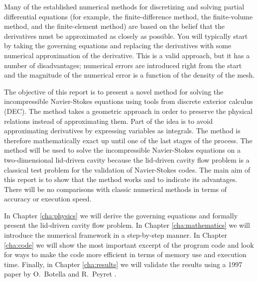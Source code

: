 Many of the established numerical methods for discretizing and solving partial differential equations (for example, the finite-difference method, the finite-volume method, and the finite-element method) are based on the belief that the derivatives must be approximated as closely as possible. You will typically start by taking the governing equations and replacing the derivatives with some numerical approximation of the derivative. This is a valid approach, but it has a number of disadvantages; numerical errors are introduced right from the start and the magnitude of the numerical error is a  function of the density of the mesh.  

The objective of this report is to present a novel method for solving the incompressible Navier-Stokes equations using tools from discrete exterior calculus (DEC). The method takes a geometric approach in order to preserve the physical relations instead of approximating them. Part of the idea is to avoid approximating derivatives by expressing variables as integrals. The method is therefore mathematically exact up until one of the last stages of the process. The method will be used to solve the incompressible Navier-Stokes equations on a two-dimensional lid-driven cavity because the lid-driven cavity flow problem is a classical test problem for the validation of Navier-Stokes codes. The main aim of this report is to show that the method works and to indicate its advantages. There will be no comparisons with classic numerical methods in terms of accuracy or execution speed.

In Chapter \ref{cha:physics} we will derive the governing equations and formally present the lid-driven cavity flow problem. In Chapter \ref{cha:mathematics} we will introduce the numerical framework in a step-by-step manner. In Chapter \ref{cha:code} we will show the most important excerpt of the program code and look for ways to make the code more efficient in terms of memory use and execution time. Finally, in Chapter \ref{cha:results} we will validate the results using a 1997 paper by O.~Botella and R.~Peyret \parencite{botella1998benchmark}.